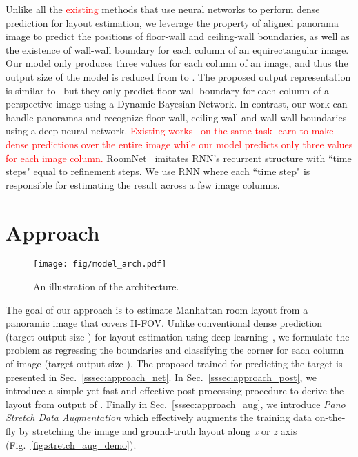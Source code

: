 \documentclass[10pt,twocolumn,letterpaper]{article}
\newcommand{\threesixty}{\text{360}\xspace}
\newcommand{\revise}[1]{\textcolor{red}{#1}}
\newcommand{\revise}[1]{#1}
\begin{document}
Unlike all the \revise{existing} methods that use neural networks to perform dense prediction for layout estimation, we leverage the property of aligned panorama image to predict the positions of floor-wall and ceiling-wall boundaries, as well as the existence of wall-wall boundary for each column of an equirectangular image.
Our model only produces three values for each column of an image, and thus the output size of the model is reduced from  to .
The proposed output representation is similar to~\cite{delage2006dynamic} but they only predict floor-wall boundary for each column of a perspective image using a Dynamic Bayesian Network.
In contrast, our work can handle panoramas and recognize floor-wall, ceiling-wall and wall-wall boundaries using a deep neural network.  
\revise{Existing works~\cite{zou2018layoutnet,fernandez2018layouts,yang2018dula,fernandez2019CFL} on the same task learn to make dense  predictions over the entire image while our model predicts only three values for each image column.}
RoomNet~\cite{lee2017roomnet} imitates RNN's recurrent structure with ``time steps" equal to refinement steps. We use RNN where each ``time step" is responsible for estimating the result across a few image columns.
 
\section{Approach}

\begin{figure*}[h]
   \centering
   \setlength\tabcolsep{1pt}
\texttt{[image: fig/model\_arch.pdf]}
    \caption{An illustration of the \modelname architecture. }
    \label{fig:model_arch}
\end{figure*}

The goal of our approach is to estimate Manhattan room layout from a panoramic image that covers \threesixty H-FOV. Unlike conventional dense prediction (target output size ) for layout estimation using deep learning~\cite{dasgupta2016delay,fernandez2018layouts,fernandez2018panoroom,izadinia2017im2cad,mallya2015learning,ren2016coarse,zhao2017physics}, we formulate the problem as regressing the boundaries and classifying the corner for each column of image (target output size ). The proposed \modelname trained for predicting the  target is presented in Sec.~\ref{sssec:approach_net}. In Sec.~\ref{sssec:approach_post}, we introduce a simple yet fast and effective post-processing procedure to derive the layout from output of \modelname. Finally in Sec.~\ref{sssec:approach_aug}, we introduce \textit{Pano Stretch Data Augmentation} which effectively augments the training data on-the-fly by stretching the image and ground-truth layout along \textit{x} or \textit{z} axis (Fig.~\ref{fig:stretch_aug_demo}).
\end{document}

